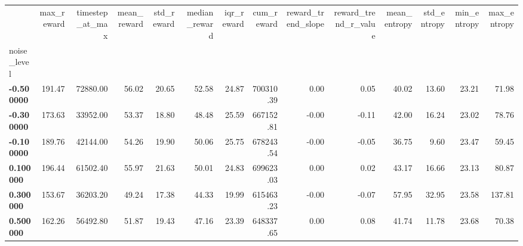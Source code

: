 \begin{tabular}{lrrrrrrrrrrrrr}
\toprule
 & max\_reward & timestep\_at\_max & mean\_reward & std\_reward & median\_reward & iqr\_reward & cum\_reward & reward\_trend\_slope & reward\_trend\_r\_value & mean\_entropy & std\_entropy & min\_entropy & max\_entropy \\
noise_level &  &  &  &  &  &  &  &  &  &  &  &  &  \\
\midrule
\textbf{-0.500000} & 191.47 & 72880.00 & 56.02 & 20.65 & 52.58 & 24.87 & 700310.39 & 0.00 & 0.05 & 40.02 & 13.60 & 23.21 & 71.98 \\
\textbf{-0.300000} & 173.63 & 33952.00 & 53.37 & 18.80 & 48.48 & 25.59 & 667152.81 & -0.00 & -0.11 & 42.00 & 16.24 & 23.02 & 78.76 \\
\textbf{-0.100000} & 189.76 & 42144.00 & 54.26 & 19.90 & 50.06 & 25.75 & 678243.54 & -0.00 & -0.05 & 36.75 & 9.60 & 23.47 & 59.45 \\
\textbf{0.100000} & 196.44 & 61502.40 & 55.97 & 21.63 & 50.01 & 24.83 & 699623.03 & 0.00 & 0.02 & 43.17 & 16.66 & 23.13 & 80.87 \\
\textbf{0.300000} & 153.67 & 36203.20 & 49.24 & 17.38 & 44.33 & 19.99 & 615463.23 & -0.00 & -0.07 & 57.95 & 32.95 & 23.58 & 137.81 \\
\textbf{0.500000} & 162.26 & 56492.80 & 51.87 & 19.43 & 47.16 & 23.39 & 648337.65 & 0.00 & 0.08 & 41.74 & 11.78 & 23.68 & 70.38 \\
\bottomrule
\end{tabular}
